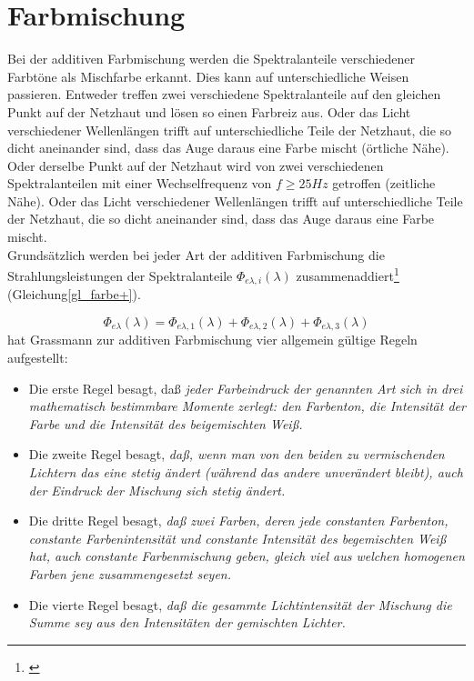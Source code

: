 \section{Farbmischung} \label{sec_farbmischung}
Bei der additiven Farbmischung werden die Spektralanteile verschiedener Farbtöne als Mischfarbe erkannt. Dies kann auf unterschiedliche Weisen passieren. Entweder treffen zwei verschiedene Spektralanteile auf den gleichen Punkt auf der Netzhaut und lösen so einen Farbreiz aus. Oder das Licht verschiedener Wellenlängen trifft auf unterschiedliche Teile der Netzhaut, die so dicht aneinander sind, dass das Auge daraus eine Farbe mischt (örtliche Nähe). Oder derselbe Punkt auf der Netzhaut wird von zwei verschiedenen Spektralanteilen mit einer Wechselfrequenz von $f\geq25Hz$ getroffen (zeitliche Nähe). Oder das Licht verschiedener Wellenlängen trifft auf unterschiedliche Teile der Netzhaut, die so dicht aneinander sind, dass das Auge daraus eine Farbe mischt.\\
Grundsätzlich werden bei jeder Art der additiven Farbmischung die Strahlungsleistungen der Spektralanteile $\Phi_{e\lambda,i}(\lambda)$ zusammenaddiert\footnote{\cite[83]{greule}} (Gleichung\ref{gl_farbe+}).

	\begin{equation}\label{gl_farbe+}
		\Phi_{e\lambda}(\lambda) = \Phi_{e\lambda,1}(\lambda) + \Phi_{e\lambda,2}(\lambda) + \Phi_{e\lambda,3}(\lambda)
	\end{equation}
 hat Grassmann zur additiven Farbmischung vier allgemein gültige Regeln aufgestellt: 

\begin{itemize}
\item Die erste Regel besagt, daß \emph{\glqq jeder Farbeindruck der genannten Art sich in drei mathematisch bestimmbare Momente zerlegt: den Farbenton, die Intensität der Farbe und die Intensität des beigemischten Weiß.\grqq} \citep[70]{grassmann}
\item Die zweite Regel besagt, \emph{\glqq daß, wenn man von den beiden zu vermischenden Lichtern das eine stetig ändert (während das andere unverändert bleibt), auch der Eindruck der Mischung sich stetig ändert.\grqq} \citep[72]{grassmann}
\item Die dritte Regel besagt, \emph{\glqq daß zwei Farben, deren jede constanten Farbenton, constante Farbenintensität und constante Intensität des begemischten Weiß hat, auch constante Farbenmischung geben, gleich viel aus welchen homogenen Farben jene zusammengesetzt seyen.\grqq} \citep[78]{grassmann}
\item Die vierte Regel besagt, \emph{\glqq daß die gesammte Lichtintensität der Mischung die Summe sey aus den Intensitäten der gemischten Lichter.\grqq} \citep[82]{grassmann}

\end{itemize}

